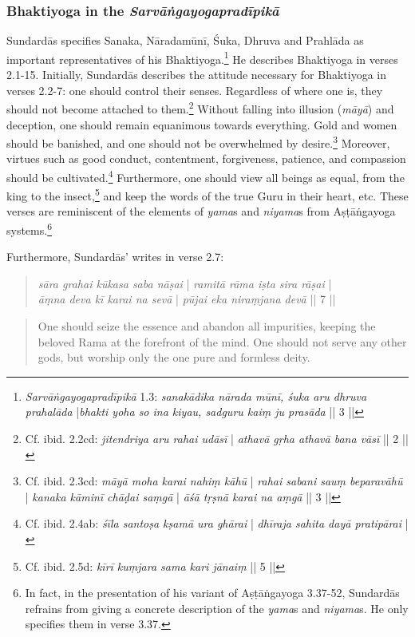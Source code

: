 \subsubsection{Bhaktiyoga in the \emph{Sarvāṅgayogapradīpikā}}
\label{sarvangabhakti}
Sundardās specifies Sanaka, Nāradamūnī, Śuka, Dhruva and Prahlāda as important representatives of his Bhaktiyoga.\footnote{\emph{Sarvāṅgayogapradīpikā} 1.3: \textit{sanakādika nārada mūnī, śuka aru dhruva prahalāda} |\textit{bhakti yoha so ina kiyau, sadguru kaiṃ ju prasāda} || 3 ||} He describes Bhaktiyoga in verses 2.1-15. Initially, Sundardās describes the attitude necessary for Bhaktiyoga in verses 2.2-7: one should control their senses. Regardless of where one is, they should not become attached to them.\footnote{Cf. ibid. 2.2cd: \textit{jitendriya aru rahai udāsī} | \textit{athavā gṛha athavā bana vāsī} || 2 ||} Without falling into illusion (\textit{māyā}) and deception, one should remain equanimous towards everything. Gold and women should be banished, and one should not be overwhelmed by desire.\footnote{Cf. ibid. 2.3cd: \textit{māyā moha karai nahiṃ kāhū} | \textit{rahai sabani sauṃ beparavāhū} | \textit{kanaka kāminī chāḍai saṃgā} | \textit{āśā tṛṣnā karai na aṃgā} || 3 ||} Moreover, virtues such as good conduct, contentment, forgiveness, patience, and compassion should be cultivated.\footnote{Cf. ibid. 2.4ab: \textit{śīla santoṣa kṣamā ura ghārai} | \textit{dhīraja sahita dayā pratipārai} |} Furthermore, one should view all beings as equal, from the king to the insect,\footnote{Cf. ibid. 2.5d: \textit{kīrī kuṃjara sama kari jānaiṃ} || 5 ||} and keep the words of the true Guru in their heart, etc. These verses are reminiscent of the elements of \emph{yama}s and \emph{niyama}s from Aṣṭāṅgayoga systems.\footnote{In fact, in the presentation of his variant of Aṣṭāṅgayoga 3.37-52, Sundardās refrains from giving a concrete description of the \emph{yama}s and \emph{niyama}s. He only specifies them in verse 3.37.}

Furthermore, Sundardās' writes in verse 2.7:
\begin{quote}
\textit{sāra grahai kūkasa saba nāṣai} | \textit{ramitā rāma iṣta sira rāṣai} | \\
\textit{āṃna deva kī karai na sevā} | \textit{pūjai eka niraṃjana devā} || 7 ||
\end{quote}
\begin{quote}
One should seize the essence and abandon all impurities, keeping the beloved Rama at the forefront of the mind. One should not serve any other gods, but worship only the one pure and formless deity.
\end{quote}

